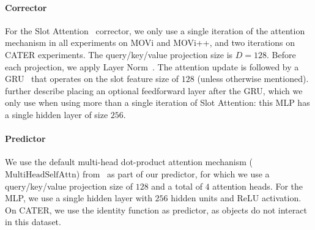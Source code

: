 \documentclass{article}
\begin{document}
\paragraph{Corrector}
For the Slot Attention~\citep{locatello2020object} corrector, we only use a single iteration of the attention mechanism in all experiments on MOVi and MOVi++, and two iterations on CATER experiments.  The query/key/value projection size is $D=128$. Before each projection, we apply Layer Norm~\citep{ba2016layer}. The attention update is followed by a GRU~\citep{cho2014learning} that operates on the slot feature size of $128$ (unless otherwise mentioned). \citet{locatello2020object} further describe placing an optional feedforward layer after the GRU, which we only use when using more than a single iteration of Slot Attention: this MLP has a single hidden layer of size $256$.

\paragraph{Predictor}
We use the default multi-head dot-product attention mechanism ($\mathrm{MultiHeadSelfAttn}$) from~\citet{vaswani2017attention} as part of our predictor, for which we use a query/key/value projection size of $128$ and a total of $4$ attention heads. For the MLP, we use a single hidden layer with $256$ hidden units and ReLU activation. On CATER, we use the identity function as predictor, as objects do not interact in this dataset.
\end{document}
